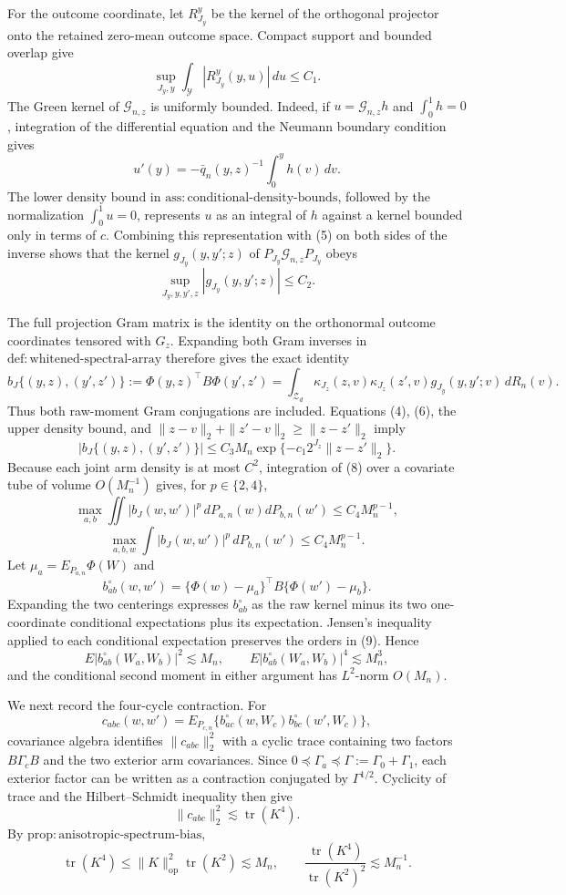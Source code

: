 For the outcome coordinate, let \(R^y_{J_y}\) be the kernel of the orthogonal projector onto the retained zero-mean outcome space. Compact support and bounded overlap give
\[
\sup_{J_y,y}\int_{\mathcal Y}|R^y_{J_y}(y,u)|\,du\le C_1. \tag{5}
\]
The Green kernel of \(\mathcal G_{n,z}\) is uniformly bounded. Indeed, if \(u=\mathcal G_{n,z}h\) and \(\int_0^1h=0\), integration of the differential equation and the Neumann boundary condition gives
\[
u'(y)=-\bar q_n(y,z)^{-1}\int_0^yh(v)\,dv.
\]
The lower density bound in \(\mathrm{ass{:}conditional\text{-}density\text{-}bounds}\), followed by the normalization \(\int_0^1u=0\), represents \(u\) as an integral of \(h\) against a kernel bounded only in terms of \(c\). Combining this representation with (5) on both sides of the inverse shows that the kernel \(g_{J_y}(y,y';z)\) of \(P_{J_y}\mathcal G_{n,z}P_{J_y}\) obeys
\[
\sup_{J_y,y,y',z}|g_{J_y}(y,y';z)|\le C_2. \tag{6}
\]

The full projection Gram matrix is the identity on the orthonormal outcome coordinates tensored with \(G_z\). Expanding both Gram inverses in \(\mathrm{def{:}whitened\text{-}spectral\text{-}array}\) therefore gives the exact identity
\[
b_J\{(y,z),(y',z')\}
:=\Phi(y,z)^{\top}B\Phi(y',z')
=\int_{\mathcal Z_d}\kappa_{J_z}(z,v)\kappa_{J_z}(z',v)
g_{J_y}(y,y';v)\,dR_n(v). \tag{7}
\]
Thus both raw-moment Gram conjugations are included. Equations (4), (6), the upper density bound, and \(\|z-v\|_2+\|z'-v\|_2\ge\|z-z'\|_2\) imply
\[
|b_J\{(y,z),(y',z')\}|
\le C_3M_n\exp\{-c_1 2^{J_z}\|z-z'\|_2\}. \tag{8}
\]
Because each joint arm density is at most \(C^2\), integration of (8) over a covariate tube of volume \(O(M_n^{-1})\) gives, for \(p\in\{2,4\}\),
\[
\max_{a,b}\iint|b_J(w,w')|^p\,dP_{a,n}(w)dP_{b,n}(w')
\le C_4M_n^{p-1},
\]
\[
\max_{a,b,w}\int|b_J(w,w')|^p\,dP_{b,n}(w')
\le C_4M_n^{p-1}. \tag{9}
\]
Let \(\mu_a=E_{P_{a,n}}\Phi(W)\) and
\[
b_{ab}^{\circ}(w,w')=
\{\Phi(w)-\mu_a\}^{\top}B\{\Phi(w')-\mu_b\}.
\]
Expanding the two centerings expresses \(b_{ab}^{\circ}\) as the raw kernel minus its two one-coordinate conditional expectations plus its expectation. Jensen's inequality applied to each conditional expectation preserves the orders in (9). Hence
\[
E|b_{ab}^{\circ}(W_a,W_b)|^2\lesssim M_n,
\qquad
E|b_{ab}^{\circ}(W_a,W_b)|^4\lesssim M_n^3, \tag{10}
\]
and the conditional second moment in either argument has \(L^2\)-norm \(O(M_n)\).

We next record the four-cycle contraction. For
\[
c_{abc}(w,w')=E_{P_{c,n}}
\{b_{ac}^{\circ}(w,W_c)b_{bc}^{\circ}(w',W_c)\},
\]
covariance algebra identifies \(\|c_{abc}\|_2^2\) with a cyclic trace containing two factors \(B\Gamma_cB\) and the two exterior arm covariances. Since \(0\preceq\Gamma_a\preceq\Gamma:=\Gamma_0+\Gamma_1\), each exterior factor can be written as a contraction conjugated by \(\Gamma^{1/2}\). Cyclicity of trace and the Hilbert--Schmidt inequality then give
\[
\|c_{abc}\|_2^2\lesssim\operatorname{tr}(K^4).
\]
By \(\mathrm{prop{:}anisotropic\text{-}spectrum\text{-}bias}\),
\[
\operatorname{tr}(K^4)
\le\|K\|_{\mathrm{op}}^2\operatorname{tr}(K^2)\lesssim M_n,
\qquad
\frac{\operatorname{tr}(K^4)}{\operatorname{tr}(K^2)^2}\lesssim M_n^{-1}. \tag{11}
\]

